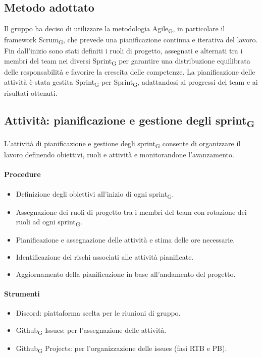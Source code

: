 \documentclass[11pt,a4paper]{article}
\newcommand{\gls}[1]{#1\textsubscript{G}}
\begin{document}
\subsection{Metodo adottato}
Il gruppo ha deciso di utilizzare la metodologia \gls{Agile}, in particolare il framework \gls{Scrum}, che prevede una pianificazione continua e iterativa del lavoro. 
Fin dall’inizio sono stati definiti i ruoli di progetto, assegnati e alternati tra i membri del team nei diversi \gls{Sprint} per garantire una distribuzione equilibrata delle responsabilità e favorire la crescita delle competenze.
La pianificazione delle attività è stata gestita \gls{Sprint} per \gls{Sprint}, adattandosi ai progressi del team e ai risultati ottenuti. 

\subsection{Attività: pianificazione e gestione degli \gls{sprint}}
L’attività di pianificazione e gestione degli \gls{sprint} consente di organizzare il lavoro definendo obiettivi, ruoli e attività e monitorandone l’avanzamento.

\paragraph{Procedure}
\begin{itemize}
\item Definizione degli obiettivi all’inizio di ogni \gls{sprint}.
\item Assegnazione dei ruoli di progetto tra i membri del team con rotazione dei ruoli ad ogni \gls{sprint}.
\item Pianificazione e assegnazione delle attività e stima delle ore necessarie.
\item Identificazione dei rischi associati alle attività pianificate.
\item Aggiornamento della pianificazione in base all’andamento del progetto.
\end{itemize}

\paragraph{Strumenti}
\begin{itemize}
\item Discord: piattaforma scelta per le riunioni di gruppo.
\item \gls{Github} Issues: per l'assegnazione delle attività.
\item \gls{Github} Projects: per l'organizzazione delle issues (fasi RTB e PB).
\end{itemize}
\end{document}
